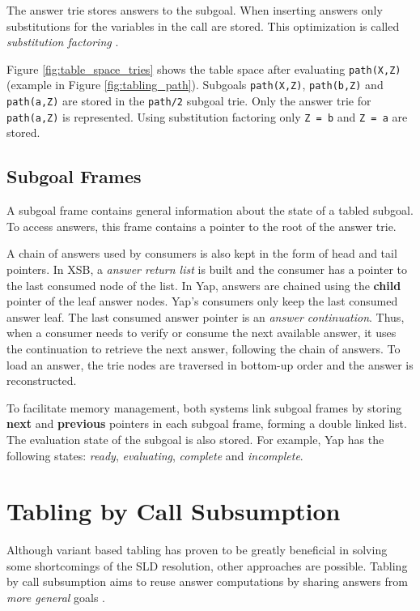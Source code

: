 The answer trie stores answers to the subgoal. When inserting answers only substitutions
for the variables in the call are stored. This optimization is called \textit{substitution factoring} \cite{RamakrishnanIV-95}.

Figure \ref{fig:table_space_tries} shows the table space after evaluating \texttt{path(X,Z)} (example in Figure \ref{fig:tabling_path}).
Subgoals \texttt{path(X,Z)}, \texttt{path(b,Z)} and \texttt{path(a,Z)} are stored in the \texttt{path/2} subgoal trie.
Only the answer trie for \texttt{path(a,Z)} is represented. Using substitution factoring only \texttt{Z = b} and \texttt{Z = a}
are stored.

\subsection{Subgoal Frames}

A subgoal frame contains general information about the state of a tabled subgoal.
To access answers, this frame contains a pointer to the root of the answer trie.

A chain of answers used by consumers is also kept in the form of head and tail pointers.
In XSB, a \textit{answer return list} is built and the consumer has a pointer to the last consumed node of the list.
In Yap, answers are chained using the \textbf{child} pointer of the leaf answer nodes. Yap's consumers only keep
the last consumed answer leaf. The last consumed answer pointer is an \textit{answer continuation}. Thus, when
a consumer needs to verify or consume the next available answer, it uses the continuation to retrieve the next
answer, following the chain of answers. To load an answer, the trie nodes are traversed in bottom-up order and the answer is reconstructed.

To facilitate memory management, both systems link subgoal frames by storing
\textbf{next} and \textbf{previous} pointers in each subgoal frame, forming a double linked list.
The evaluation state of the subgoal is also stored. For example, Yap has the following states:
\textit{ready}, \textit{evaluating}, \textit{complete} and \textit{incomplete}.

\section{Tabling by Call Subsumption} \label{sec:subsumption}

Although variant based tabling has proven to be greatly beneficial in solving some shortcomings of the SLD resolution,
other approaches are possible. Tabling by call subsumption aims to reuse answer computations by sharing answers from
\textit{more general} goals \cite{Johnson-99}.

